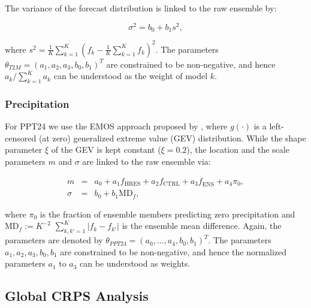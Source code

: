 The variance of the forecast distribution is linked to the raw
ensemble by:
\begin{linenomath*}
\begin{equation}
\sigma^{2} = b_{0} + b_{1}s^{2},
\end{equation}
\end{linenomath*}
where $s^{2} = \frac{1}{K}\sum_{k=1}^{K}(f_{k} -
\frac{1}{K}\sum_{k=1}^{K}f_{k})^{2}$. The parameters
${\theta}_{T2M}=(a_{1}, a_{2}, a_{3}, b_{0}, b_{1})^{T}$ are
constrained to be non-negative, and hence $a_{k}/\sum_{k=1}^{K} a_{k}$
can be understood as the weight of model $k$.

\subsubsection{Precipitation}
For PPT24 we use the EMOS approach proposed by \citet{Scheu14}, where
$g(\cdot)$ is a left-censored (at zero) generalized extreme value
(GEV) distribution. While the shape parameter $\xi$ of the GEV is kept
constant ($\xi=0.2$), the location and the scale parameters $m$ and
$\sigma$ are linked to the raw ensemble via:
\begin{linenomath*}
\begin{eqnarray}
m &=& a_{0} + a_{1} f_{\mathrm{HRES}} + a_{2} f_{\mathrm{CTRL}} +
a_{3} f_{\overline{\mathrm{ENS}}} + a_{4} \pi_{0},\nonumber\\
\sigma &=& b_{0} + b_{1} \mathrm{MD}_{f},
\end{eqnarray}
\end{linenomath*}
where $\pi_{0}$ is the fraction of ensemble members predicting zero
precipitation and $\mathrm{MD}_{f}:= K^{-2}$\break
$\sum_{k, k' = 1}^{K} |
f_{k} - f_{k'} |$ is the ensemble mean difference. Again, the
parameters are denoted by $\theta_{PPT24}=(a_{0}, \dots, a_{4}, b_{0},
b_{1})^{T}$. The parameters $a_{1}, a_{2}, a_{3}, b_{0}, b_{1}$ are
constrained to be non-negative, and hence the normalized parameters
$a_{1}$ to $a_{3}$ can be understood as weights.

\subsection{Global CRPS Analysis}
 \label{sec:meth_glob_crps}

